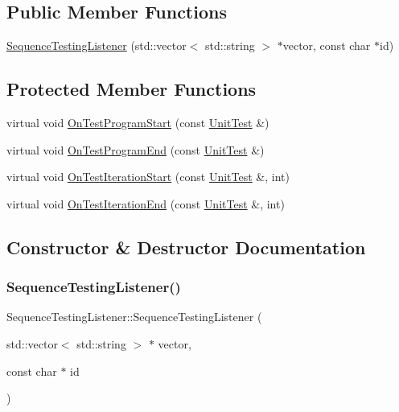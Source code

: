 \subsection*{Public Member Functions}
\begin{DoxyCompactItemize}
\item 
\hyperlink{class_sequence_testing_listener_ac0fcb350d20876f8273621ad4c79ba7a}{Sequence\+Testing\+Listener} (std\+::vector$<$ std\+::string $>$ $\ast$vector, const char $\ast$id)
\end{DoxyCompactItemize}
\subsection*{Protected Member Functions}
\begin{DoxyCompactItemize}
\item 
virtual void \hyperlink{class_sequence_testing_listener_a25b96acdbaa6f582e583e6b56bd39b42}{On\+Test\+Program\+Start} (const \hyperlink{classtesting_1_1_unit_test}{Unit\+Test} \&)
\item 
virtual void \hyperlink{class_sequence_testing_listener_aacac5e15bac089460841ff63a5c31f57}{On\+Test\+Program\+End} (const \hyperlink{classtesting_1_1_unit_test}{Unit\+Test} \&)
\item 
virtual void \hyperlink{class_sequence_testing_listener_a345641262fa10cc4b251ac54116db74b}{On\+Test\+Iteration\+Start} (const \hyperlink{classtesting_1_1_unit_test}{Unit\+Test} \&, int)
\item 
virtual void \hyperlink{class_sequence_testing_listener_a783bc01e2a95f5bf73bbde4d96832e0f}{On\+Test\+Iteration\+End} (const \hyperlink{classtesting_1_1_unit_test}{Unit\+Test} \&, int)
\end{DoxyCompactItemize}


\subsection{Constructor \& Destructor Documentation}
\mbox{\label{class_sequence_testing_listener_ac0fcb350d20876f8273621ad4c79ba7a}} 
\subsubsection{\texorpdfstring{Sequence\+Testing\+Listener()}{SequenceTestingListener()}}
{\footnotesize\ttfamily Sequence\+Testing\+Listener\+::\+Sequence\+Testing\+Listener (\begin{DoxyParamCaption}\item[{std\+::vector$<$ std\+::string $>$ $\ast$}]{vector,  }\item[{const char $\ast$}]{id }\end{DoxyParamCaption})\hspace{0.3cm}{\ttfamily [inline]}}



